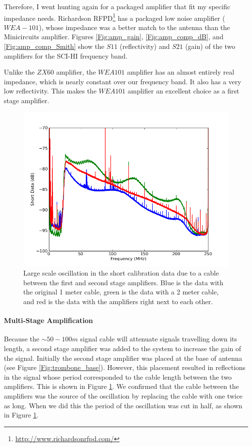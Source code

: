 Therefore, I went hunting again for a packaged amplifier that fit my specific impedance needs. Richardson RFPD\footnote{\url{http://www.richardsonrfpd.com/}} has a packaged low noise amplifier ($WEA-101$), whose impedance was a better match to the antenna than the Minicircuits amplifier. Figures \ref{Fig:amp_gain}, \ref{Fig:amp_comp_dB}, and \ref{Fig:amp_comp_Smith} show the $S11$ (reflectivity) and $S21$ (gain) of the two amplifiers for the SCI-HI frequency band. 

Unlike the $ZX60$ amplifier, the $WEA101$ amplifier has an almost entirely real impedance, which is nearly constant over our frequency band. It also has a very low reflectivity. This makes the $WEA101$ amplifier an excellent choice as a first stage amplifier. 

\begin{figure}[htb]
\begin{center}
\includegraphics[width=0.9\linewidth]{SCIHI_system/figures/antenna_rf_cable_reflections.png}
\caption{Large scale oscillation in the short calibration data due to a cable between the first and second stage amplifiers. Blue is the data with the original 1 meter cable, green is the data with a 2 meter cable, and red is the data with the amplifiers right next to each other.}
\label{Fig:amp_reflect}
\end{center}
\end{figure}

\paragraph{Multi-Stage Amplification}

Because the $\sim 50-100 m$ signal cable will attenuate signals travelling down its length, a second stage amplifier was added to the system to increase the gain of the signal. Initially the second stage amplifier was placed at the base of antenna (see Figure \ref{Fig:trombone_base}). However, this placement resulted in reflections in the signal whose period corresponded to the cable length between the two amplifiers. This is shown in Figure \ref{Fig:amp_reflect}. We confirmed that the cable between the amplifiers was the source of the oscillation by replacing the cable with one twice as long. When we did this the period of the oscillation was cut in half, as shown in Figure \ref{Fig:amp_reflect}. 

